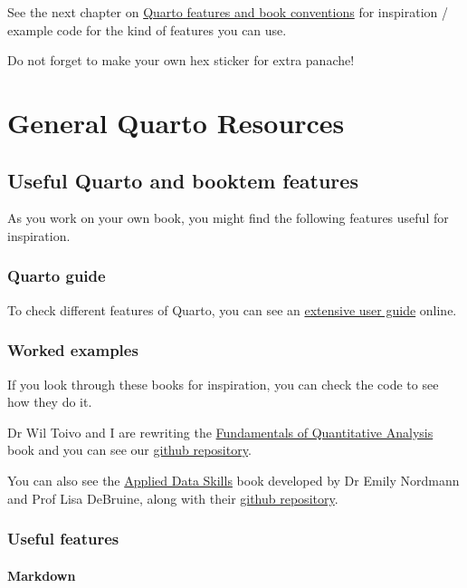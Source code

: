 \documentclass[
  letterpaper,
  DIV=11,
  numbers=noendperiod]{scrreprt}
\begin{document}
See the next chapter on \hyperref[quarto_features]{Quarto features and
book conventions} for inspiration / example code for the kind of
features you can use.

Do not forget to make your own hex sticker for extra panache!

\part{General Quarto Resources}

\chapter{Useful Quarto and booktem features}\label{quarto_features}

As you work on your own book, you might find the following features
useful for inspiration.

\section{Quarto guide}\label{quarto-guide}

To check different features of Quarto, you can see an
\href{https://quarto.org/docs/guide/}{extensive user guide} online.

\section{Worked examples}\label{worked-examples}

If you look through these books for inspiration, you can check the code
to see how they do it.

Dr Wil Toivo and I are rewriting the
\href{https://bartlettje.github.io/quant-fun-v3/}{Fundamentals of
Quantitative Analysis} book and you can see our
\href{https://github.com/BartlettJE/quant-fun-v3}{github repository}.

You can also see the \href{https://psyteachr.github.io/ads-v3/}{Applied
Data Skills} book developed by Dr Emily Nordmann and Prof Lisa DeBruine,
along with their \href{https://github.com/PsyTeachR/ads-v3}{github
repository}.

\section{Useful features}\label{useful-features}

\subsection{Markdown}\label{markdown}
\end{document}

